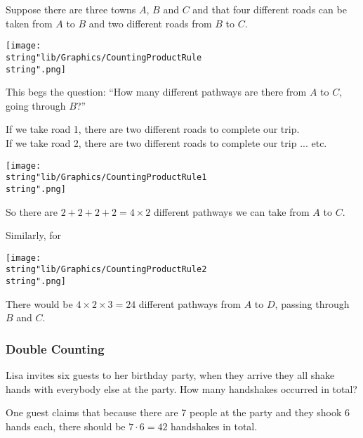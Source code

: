 \documentclass[11pt,a4paper]{book}
\begin{document}
Suppose there are three towns $A$, $B$ and $C$ and that four different
roads can be taken from $A$ to $B$ and two different roads from
$B$ to $C$.
\begin{center}
\texttt{[image: \\string"lib/Graphics/CountingProductRule\\string".png]}
\par\end{center}

This begs the question: ``How many different pathways are there from
$A$ to $C$, going through $B$?''

\begin{minipage}[t]{0.5\textwidth}

If we take road 1, there are two different roads to complete our trip.\\

If we take road 2, there are two different roads to complete our trip
... etc.\\

\end{minipage}
\begin{minipage}[t]{0.2\textwidth}
\begin{center}
\texttt{[image: \\string"lib/Graphics/CountingProductRule1\\string".png]}
\par\end{center}

\end{minipage}

So there are $2+2+2+2=4\times2$ different pathways we can take from
$A$ to $C$.

\newpage

Similarly, for
\begin{center}
\texttt{[image: \\string"lib/Graphics/CountingProductRule2\\string".png]}
\par\end{center}

There would be $4\times2\times3=24$ different pathways from $A$
to $D$, passing through $B$ and $C$.

\subsubsection{Double Counting}

Lisa invites six guests to her birthday party, when they arrive they all shake hands with everybody else at the party. How many handshakes occurred in total?

One guest claims that because there are 7 people at the party and they shook 6 hands each, there should be $7\cdot6=42$ handshakes in total.
\end{document}
